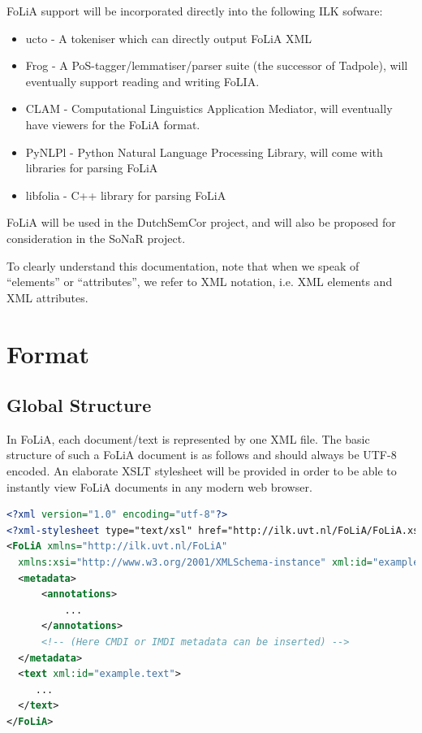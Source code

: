 \documentclass[a4paper,12pt]{report}
\begin{document}
FoLiA support will be incorporated directly into the following ILK sofware:

\begin{itemize} 
\item ucto - A tokeniser which can directly output FoLiA XML 
\item Frog - A PoS-tagger/lemmatiser/parser suite (the successor of Tadpole), will eventually support reading and writing FoLIA.
\item CLAM - Computational Linguistics Application Mediator, will eventually have viewers for the FoLiA format.
\item PyNLPl - Python Natural Language Processing Library, will come with libraries for parsing FoLiA
\item libfolia - C++ library for parsing FoLiA
\end{itemize}

FoLiA will be used in the DutchSemCor project, and will also be proposed for consideration in the SoNaR project.

To clearly understand this documentation, note that when we speak of ``elements'' or ``attributes'', we refer to XML notation, i.e. XML elements and XML attributes.

\chapter{Format}

\section{Global Structure}

In FoLiA, each document/text is represented by one XML file. The basic structure of such a FoLiA document is as follows and should always be UTF-8 encoded. An elaborate XSLT stylesheet will be provided in order to be able to instantly view FoLiA documents in any modern web browser.

\begin{lstlisting}[language=xml]
<?xml version="1.0" encoding="utf-8"?>
<?xml-stylesheet type="text/xsl" href="http://ilk.uvt.nl/FoLiA/FoLiA.xsl"?>
<FoLiA xmlns="http://ilk.uvt.nl/FoLiA"
  xmlns:xsi="http://www.w3.org/2001/XMLSchema-instance" xml:id="example">
  <metadata>
      <annotations>
          ...
      </annotations>    
      <!-- (Here CMDI or IMDI metadata can be inserted) -->
  </metadata>
  <text xml:id="example.text">
     ...
  </text>
</FoLiA>  
\end{lstlisting}
\end{document}
